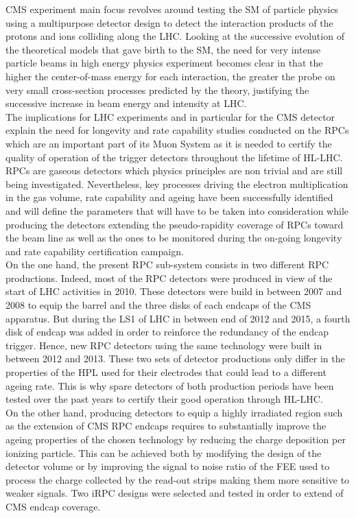 CMS experiment main focus revolves around testing the \acf{SM} of particle physics using a multipurpose detector design to detect the interaction products of the protons and ions colliding along the LHC. Looking at the successive evolution of the theoretical models that gave birth to the SM, the need for very intense particle beams in high energy physics experiment becomes clear in that the higher the center-of-mass energy for each interaction, the greater the probe on very small cross-section processes predicted by the theory, justifying the successive increase in beam energy and intensity at LHC.\\
The implications for LHC experiments and in particular for the CMS detector explain the need for longevity and rate capability studies conducted on the \acl{RPC}s which are an important part of its Muon System as it is needed to certify the quality of operation of the trigger detectors throughout the lifetime of HL-LHC.\\
RPCs are gaseous detectors which physics principles are non trivial and are still being investigated. Nevertheless, key processes driving the electron multiplication in the gas volume, rate capability and ageing have been successfully identified and will define the parameters that will have to be taken into consideration while producing the detectors extending the pseudo-rapidity coverage of RPCs toward the beam line as well as the ones to be monitored during the on-going longevity and rate capability certification campaign.\\
On the one hand, the present RPC sub-system consists in two different RPC productions. Indeed, most of the RPC detectors were produced in view of the start of LHC activities in 2010. These detectors were build in between 2007 and 2008 to equip the barrel and the three disks of each endcaps of the CMS apparatus. But during the \acf{LS1} of LHC in between end of 2012 and 2015, a fourth disk of endcap was added in order to reinforce the redundancy of the endcap trigger. Hence, new RPC detectors using the same technology were built in between 2012 and 2013. These two sets of detector productions only differ in the properties of the \acf{HPL} used for their electrodes that could lead to a different ageing rate. This is why spare detectors of both production periods have been tested over the past years to certify their good operation through HL-LHC.\\
On the other hand, producing detectors to equip a highly irradiated region such as the extension of CMS RPC endcaps requires to substantially improve the ageing properties of the chosen technology by reducing the charge deposition per ionizing particle. This can be achieved both by modifying the design of the detector volume or by improving the signal to noise ratio of the \acf{FEE} used to process the charge collected by the read-out strips making them more sensitive to weaker signals. Two \acf{iRPC} designs were selected and tested in order to extend of CMS endcap coverage.\\
